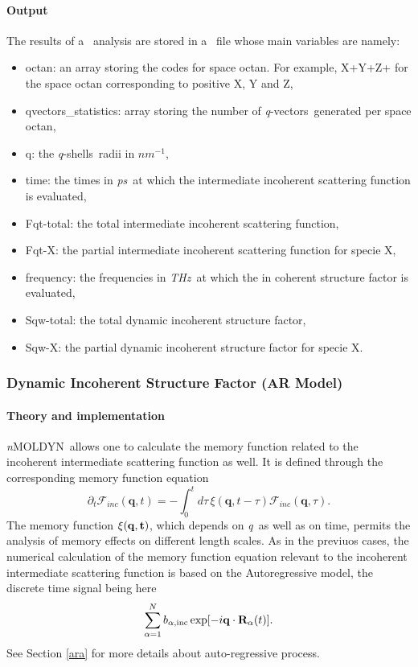 \documentclass[a4paper,11pt]{report}
\newcommand{\ps}{\textit{ps}}
\newcommand{\invnm}{$nm^{-1}$}
\newcommand{\thz}{\textit{THz}}
\newcommand{\qval}{\textit{q}}
\newcommand{\qvects}{\textit{q}-vectors}
\newcommand{\qshells}{\textit{q}-shells}
\newcommand{\NMOLDYN}{\textit{n}MOLDYN}
\begin{document}
\paragraph{Output\\}
The results of a \DISF\ analysis are stored in a \NetCDF\ file whose main variables are namely:
\begin{itemize}
\item octan: an array storing the codes for space octan. For example, X+Y+Z+ for the space octan corresponding to positive
X, Y and Z,
\item qvectors\_statistics: array storing the number of \qvects\ generated per space octan,
\item q: the \qshells\ radii in \invnm ,
\item time: the times in \ps\ at which the intermediate incoherent scattering function is evaluated,
\item Fqt-total: the total intermediate incoherent scattering function,
\item Fqt-X: the partial intermediate incoherent scattering function for specie X,
\item frequency: the frequencies in \thz\ at which the in coherent structure factor is evaluated,
\item Sqw-total: the total dynamic incoherent structure factor,
\item Sqw-X: the partial dynamic incoherent structure factor for specie X.
\end{itemize}

\subsubsection{Dynamic Incoherent Structure Factor (AR Model)}
\label{disfar}
\paragraph{Theory and implementation\\}
\label{disfar_theory}
\NMOLDYN\ allows one to calculate the memory function related to the incoherent intermediate scattering function as well. 
It is defined through the corresponding memory function equation
\begin{equation}
\label{eq:mem_finc}
\partial_t{\mathcal F_{inc}}(\mathbf{q},t) =
-\int_{0}^{t}d\tau\,\xi(\mathbf{q},t-\tau){\mathcal F_{inc}}(\mathbf{q},\tau).
\end{equation}
The memory function $\xi(\bf{q},t)$, which depends on \qval\ as well as on time, permits the analysis of memory effects on 
different length scales. As in the previuos cases, the numerical calculation of the memory function equation relevant to 
the incoherent intermediate scattering function is based on the Autoregressive model, the discrete time signal being here
\begin{equation}
\label{eq:disfar_rho}
\sum_{\alpha=1}^N b_{\alpha,\mathrm{inc}}\exp[-i{\bf q}\cdot{\bf R}_\alpha(t)].
\end{equation}
See Section \ref{ara} for more details about auto-regressive process.
\end{document}
